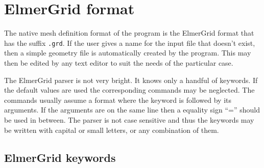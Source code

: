 

\chapter{ElmerGrid format}

The native mesh definition format of the program is the ElmerGrid
format that has the suffix \texttt{.grd}. 
If the user gives a name for the input file that doesn't exist, then
a simple geometry file is automatically created by the program.
This may then be edited by any text editor to suit the needs of the particular case.

The ElmerGrid parser is not very bright. It knows only
a handful of keywords. If the default values are 
used the corresponding commands may be neglected. 
The commands usually assume a format where 
the keyword is followed by its arguments. 
If the arguments are on the same line then a equality sign 
``='' should be used in between. 
The parser is not case sensitive and thus the keywords may be written with 
capital or small letters, or any combination of them.


\section{ElmerGrid keywords}

